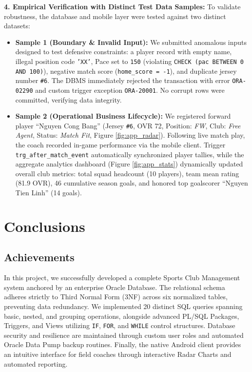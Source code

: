 \documentclass[fonts]{icst}
\begin{document}
\textbf{4. Empirical Verification with Distinct Test Data Samples:}
To validate robustness, the database and mobile layer were tested against two distinct datasets:
\begin{itemize}
    \item \textbf{Sample 1 (Boundary \& Invalid Input):} We submitted anomalous inputs designed to test defensive constraints: a player record with empty name, illegal position code \texttt{'XX'}, Pace set to \texttt{150} (violating \texttt{CHECK (pac BETWEEN 0 AND 100)}), negative match score (\texttt{home\_score = -1}), and duplicate jersey number \texttt{\#6}. The DBMS immediately rejected the transaction with error \texttt{ORA-02290} and custom trigger exception \texttt{ORA-20001}. No corrupt rows were committed, verifying data integrity.
    \item \textbf{Sample 2 (Operational Business Lifecycle):} We registered forward player ``Nguyen Cong Bang'' (Jersey \texttt{\#6}, OVR 72, Position: \textit{FW}, Club: \textit{Free Agent}, Status: \textit{Match Fit}, Figure \ref{fig:app_radar}). Following live match play, the coach recorded in-game performance via the mobile client. Trigger \texttt{trg\_after\_match\_event} automatically synchronized player tallies, while the aggregate analytics dashboard (Figure \ref{fig:app_stats}) dynamically updated overall club metrics: total squad headcount (10 players), team mean rating (81.9 OVR), 46 cumulative season goals, and honored top goalscorer ``Nguyen Tien Linh'' (14 goals).
\end{itemize}

\section{Conclusions}
\subsection{Achievements}
In this project, we successfully developed a complete Sports Club Management system anchored by an enterprise Oracle Database. The relational schema adheres strictly to Third Normal Form (3NF) across six normalized tables, preventing data redundancy. We implemented 20 distinct SQL queries spanning basic, nested, and grouping operations, alongside advanced PL/SQL Packages, Triggers, and Views utilizing \texttt{IF}, \texttt{FOR}, and \texttt{WHILE} control structures. Database security and resilience are maintained through custom user roles and automated Oracle Data Pump backup routines. Finally, the native Android client provides an intuitive interface for field coaches through interactive Radar Charts and automated reporting.
\end{document}
